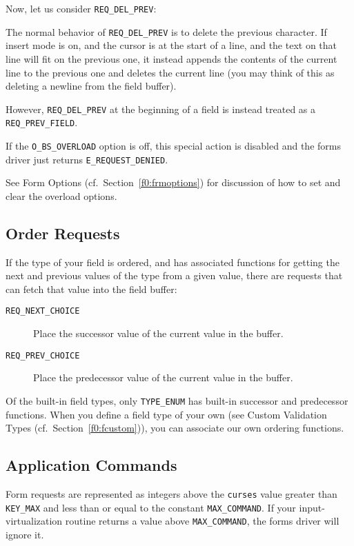 Now, let us consider \texttt{REQ\_DEL\_PREV}: 

The normal behavior of \texttt{REQ\_DEL\_PREV} is to delete the previous
character.  If insert mode is on, and the cursor is at the start of a
line, and the text on that line will fit on the previous one, it
instead appends the contents of the current line to the previous one
and deletes the current line (you may think of this as deleting a
newline from the field buffer). 

However, \texttt{REQ\_DEL\_PREV} at the beginning of a field is instead
treated as a \texttt{REQ\_PREV\_FIELD}. 

 If the
\texttt{O\_BS\_OVERLOAD} option is off, this special action is
disabled and the forms driver just returns \texttt{E\_REQUEST\_DENIED}. 

See Form Options (cf.\ Section~\ref{f0:frmoptions}) for discussion of how to set
and clear the overload options.

\subsection{Order Requests}

\label{f0:forder}If the type of your field is ordered, and has associated functions
for getting the next and previous values of the type from a given value,
there are requests that can fetch that value into the field buffer:
\begin{description}
\item[ \texttt{REQ\_NEXT\_CHOICE}]  Place the successor value of the current value in the buffer.
\item[ \texttt{REQ\_PREV\_CHOICE}]  Place the predecessor value of the current value in the buffer.
\end{description}
Of the built-in field types, only \texttt{TYPE\_ENUM} has built-in successor
and predecessor functions.  When you define a field type of your own
(see Custom Validation Types (cf.\ Section~\ref{f0:fcustom})), you can associate
our own ordering functions.

\subsection{Application Commands}

\label{f0:fappcmds}Form requests are represented as integers above the \texttt{curses} value
greater than \texttt{KEY\_MAX} and less than or equal to the constant
\texttt{MAX\_COMMAND}.  If your input-virtualization routine returns a
value above \texttt{MAX\_COMMAND}, the forms driver will ignore it.

